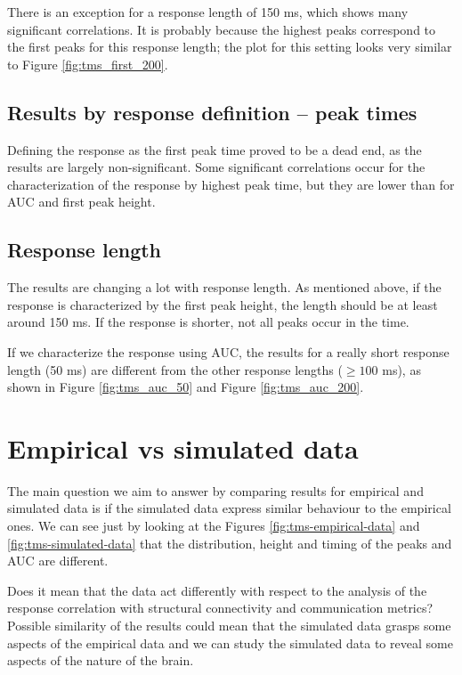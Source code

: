 There is an exception for a response length of 150 ms, which shows many significant correlations. It is probably because the highest peaks correspond to the first peaks for this response length; the plot for this setting looks very similar to Figure \ref{fig:tms_first_200}. 

\subsection{Results by response definition -- peak times}

Defining the response as the first peak time proved to be a dead end, as the results are largely non-significant. Some significant correlations occur for the characterization of the response by highest peak time, but they are lower than for AUC and first peak height.

\subsection{Response length}

The results are changing a lot with response length. As mentioned above, if the response is characterized by the first peak height, the length should be at least around 150 ms. If the response is shorter, not all peaks occur in the time. 

If we characterize the response using AUC, the results for a really short response length (50 ms) are different from the other response lengths ($\geq100$ ms), as shown in Figure \ref{fig:tms_auc_50} and Figure \ref{fig:tms_auc_200}.

\section{Empirical vs simulated data}

The main question we aim to answer by comparing results for empirical and simulated data is if the simulated data express similar behaviour to the empirical ones. We can see just by looking at the Figures \ref{fig:tms-empirical-data} and \ref{fig:tms-simulated-data} that the distribution, height and timing of the peaks and AUC are different. 

Does it mean that the data act differently with respect to the analysis of the response correlation with structural connectivity and communication metrics? Possible similarity of the results could mean that the simulated data grasps some aspects of the empirical data and we can study the simulated data to reveal some aspects of the nature of the brain.

